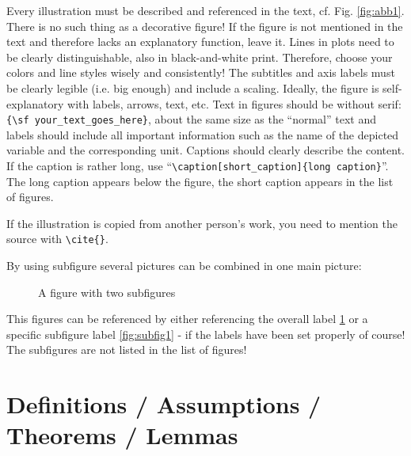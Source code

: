 Every illustration must be described and referenced in the text, cf. Fig. \ref{fig:abb1}. 
There is no such thing as a decorative figure! 
If the figure is not mentioned in the text and therefore lacks an explanatory function, leave it.
Lines in plots need to be clearly distinguishable, also in black-and-white print. Therefore, choose your colors and line styles wisely and consistently!
The subtitles and axis labels must be clearly legible (i.e. big enough) and include a scaling. Ideally, the figure is self-explanatory with labels, arrows, text, etc. Text in figures should be without serif: \verb|{\sf your_text_goes_here}|, about the same size as the ``normal'' text and labels should include all important information such as the name of the depicted variable and the corresponding unit. Captions should clearly describe the content. If the caption is rather long, use ``\verb|\caption[short_caption]{long caption}|''. The long caption appears below the figure, the short caption appears in the list of figures. 

If the illustration is copied from another person's work, you need to mention the
source with \verb|\cite{}|.

By using subfigure several pictures can be combined in one main picture:

\begin{figure}[htb]
\centering
{}
\quad %

\caption[Abbrev. Descr. of subfigure-figure]{A figure with two subfigures}
\label{fig:OverallPic}
\end{figure}

This figures can be referenced by either referencing the overall label \ref{fig:OverallPic} or a specific subfigure label \ref{fig:subfig1} - if the labels have been set properly of course! The subfigures are not listed in the list of figures!

\section{Definitions / Assumptions / Theorems / Lemmas}

